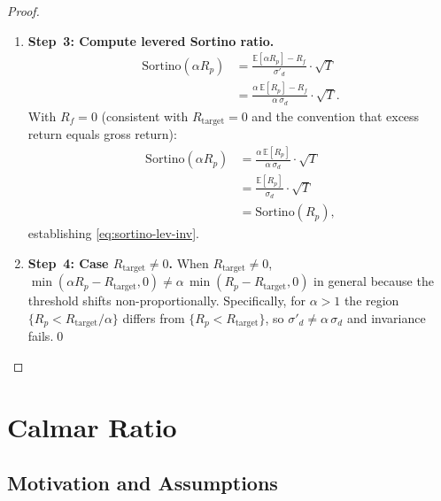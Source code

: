 \documentclass[12pt,openany]{book}
\newcommand{\E}{\mathbb{E}}
\numberwithin{equation}{chapter}
\theoremstyle{plain}
\theoremstyle{definition}
\theoremstyle{remark}
\numberwithin{equation}{chapter}
\theoremstyle{plain}
\begin{document}
\begin{proof}
\begin{enumerate}
  \item \textbf{Step~3: Compute levered Sortino ratio.}
        \begin{align}
          \mathrm{Sortino}(\alpha R_p)
            &= \frac{\E[\alpha R_p] - R_f}{\sigma'_d}
               \cdot\sqrt{T}
          \label{eq:sortino-lev-s6} \\
            &= \frac{\alpha\,\E[R_p] - R_f}
                    {\alpha\,\sigma_d}
               \cdot\sqrt{T}.
          \label{eq:sortino-lev-s7}
        \end{align}
        With $R_f = 0$ (consistent with $R_{\mathrm{target}}
        = 0$ and the convention that excess return equals
        gross return):
        \begin{align}
          \mathrm{Sortino}(\alpha R_p)
            &= \frac{\alpha\,\E[R_p]}{\alpha\,\sigma_d}
               \cdot\sqrt{T}
          \label{eq:sortino-lev-s8} \\
            &= \frac{\E[R_p]}{\sigma_d}\cdot\sqrt{T}
          \label{eq:sortino-lev-s9} \\
            &= \mathrm{Sortino}(R_p),
          \label{eq:sortino-lev-s10}
        \end{align}
        establishing \eqref{eq:sortino-lev-inv}.

  \item \textbf{Step~4: Case $R_{\mathrm{target}} \neq 0$.}
        When $R_{\mathrm{target}} \neq 0$,
        $\min(\alpha R_p - R_{\mathrm{target}}, 0)
        \neq \alpha\,\min(R_p - R_{\mathrm{target}}, 0)$
        in general because the threshold shifts
        non-proportionally.  Specifically, for $\alpha > 1$
        the region $\{R_p < R_{\mathrm{target}}/\alpha\}$
        differs from $\{R_p < R_{\mathrm{target}}\}$,
        so $\sigma'_d \neq \alpha\,\sigma_d$ and
        invariance fails.\qed
\end{enumerate}
\end{proof}

\section{Calmar Ratio}

\subsection{Motivation and Assumptions}
\end{document}
